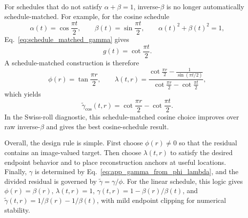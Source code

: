 For schedules that do not satisfy $\alpha+\beta=1$, inverse-$\beta$ is no longer automatically schedule-matched. For example, for the cosine schedule
\begin{equation}
\alpha(t)=\cos\frac{\pi t}{2},
\qquad
\beta(t)=\sin\frac{\pi t}{2},
\qquad
\alpha(t)^2+\beta(t)^2=1,
\end{equation}
Eq.~\eqref{eq:schedule_matched_gamma} gives
\begin{equation}
g(t)=\cot\frac{\pi t}{2}.
\end{equation}
A schedule-matched construction is therefore
\begin{equation}
\phi(r)=\tan\frac{\pi r}{2},
\qquad
\lambda(t,r)
=
\frac{
\cot\frac{\pi r}{2}
-
\frac{1}{\sin(\pi t/2)}
}{
\cot\frac{\pi r}{2}
-
\cot\frac{\pi t}{2}
},
\end{equation}
which yields
\begin{equation}
\tilde{\gamma}_{\cos}(t,r)
=
\cot\frac{\pi r}{2}
-
\cot\frac{\pi t}{2}.
\label{eq:gamma_cos}
\end{equation}
In the Swiss-roll diagnostic, this schedule-matched cosine choice improves over raw inverse-$\beta$ and gives the best cosine-schedule result.

Overall, the design rule is simple. First choose $\phi(r)\neq0$ so that the residual contains an image-valued target. Then choose $\lambda(t,r)$ to satisfy the desired endpoint behavior and to place reconstruction anchors at useful locations. Finally, $\gamma$ is determined by Eq.~\eqref{eq:app_gamma_from_phi_lambda}, and the divided residual is governed by $\tilde{\gamma}=\gamma/\phi$. For the linear schedule, this logic gives $\phi(r)=\beta(r)$, $\lambda(t,r)=1$, $\gamma(t,r)=1-\beta(r)/\beta(t)$, and $\tilde{\gamma}(t,r)=1/\beta(r)-1/\beta(t)$, with mild endpoint clipping for numerical stability.
